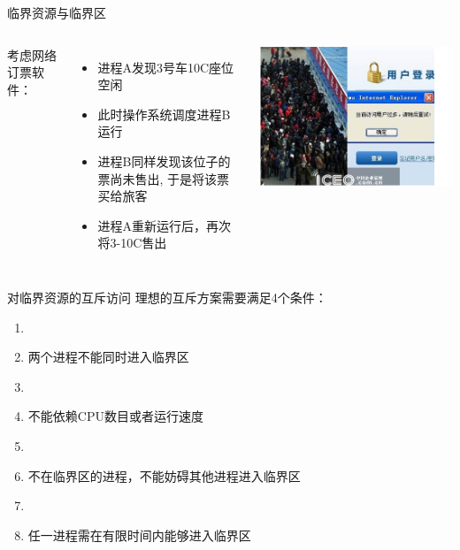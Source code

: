 \documentclass[xcolor=svgnames]{beamer}
\begin{document}
\begin{CJK*}{UTF8}{gbsn}
\begin{frame}{临界资源与临界区}
\begin{columns}%
考虑网络订票软件：
\begin{itemize}
\item 进程A发现3号车10C座位空闲
\item 此时操作系统调度进程B运行
\item 进程B同样发现该位子的票尚未售出, 于是将该票买给旅客
\item 进程A重新运行后，再次将3-10C售出
\end{itemize}
\includegraphics[width=1.0\textwidth]{booking.jpg}
\end{columns}%
\end{frame}

\begin{frame}{对临界资源的互斥访问}
理想的互斥方案需要满足4个条件：
\begin{enumerate}
\item[]
\item 两个进程不能同时进入临界区
\item[]
\item 不能依赖CPU数目或者运行速度
\item[]
\item 不在临界区的进程，不能妨碍其他进程进入临界区
\item[]
\item 任一进程需在有限时间内能够进入临界区
\end{enumerate}
\end{frame}


\end{CJK*}
\end{document}
